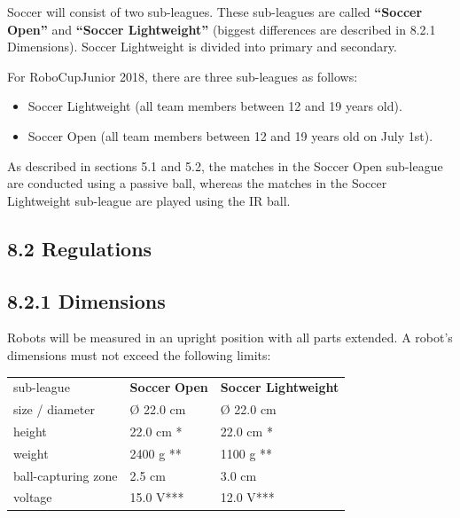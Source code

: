 \documentclass{article}
\begin{document}
Soccer will consist of two sub-leagues. These sub-leagues are called \textbf{``}\textbf{\textcolor{color-5}{Soccer Open}}\textbf{''} and \textbf{``}\textbf{\textcolor{color-5}{Soccer Lightweight}}\textbf{''} (\textcolor{color-5}{biggest differences are described in 8.2.1 Dimensions}). \textcolor{color-5}{Soccer Lightweight} \textcolor{color-5}{is} divided into primary and secondary.

For RoboCupJunior \textcolor{color-5}{2018}, there are three sub-leagues as follows: 

\begin{itemize}

\item \textcolor{color-5}{Soccer Lightweight} \textcolor{color-5}{(all team members between 12 and 19 years old}\textcolor{color-5}{).}

\item \textcolor{color-5}{Soccer Open} \textcolor{color-5}{(all team members between 12 and 19 years old on July 1st)}.

\end{itemize}
\textcolor{color-5}{As described in sections 5.1 and 5.2, the matches in the Soccer Open sub-league are conducted using a passive ball, whereas the matches in the Soccer Lightweight sub-league are played using the IR ball.}

\subsection{8.2 Regulations \label{ref-054}}

\subsection{8.2.1 Dimensions \label{ref-055}}

Robots will be measured in an upright position with all parts extended. A robot's dimensions must not exceed the following limits:

\begin{table}
\begin{tabularx}{\textwidth}{
p{}
p{}
p{}}
sub-league & \textbf{\textcolor{color-5}{Soccer}} \textbf{Open} & \textbf{\textcolor{color-5}{Soccer Lightweight}} \\
size / diameter & \O{} 22.0 cm & \O{} 22.0 cm \\
height & 22.0 cm * & 22.0 cm * \\
weight & 2400 g ** & 1100 g ** \\
ball-capturing zone & \textcolor{color-5}{2.5 cm} & 3.0 cm \\
voltage & 15.0 V\textcolor{color-5}{***} & 12.0 V\textcolor{color-5}{***} \\

\end{tabularx}

\end{table}
\end{document}
